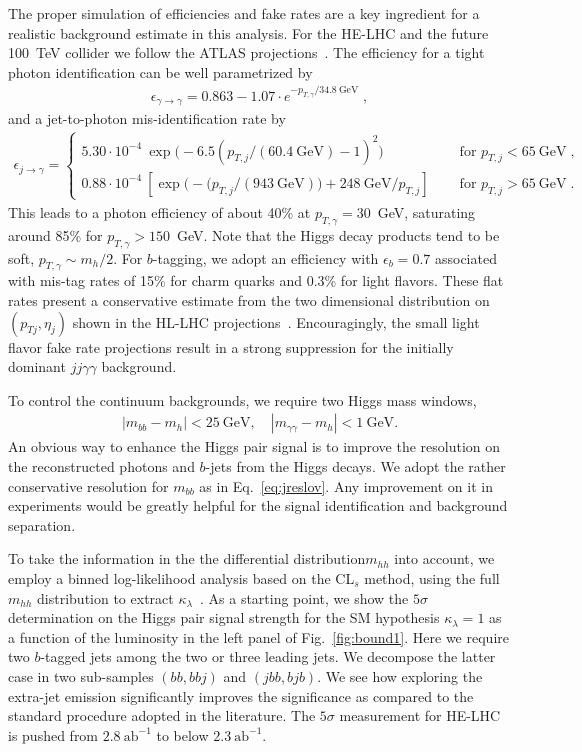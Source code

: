 The proper simulation of efficiencies and fake rates are a key
ingredient for a realistic background estimate in this analysis.  For
the HE-LHC and the future 100~TeV collider we follow the ATLAS
projections~\cite{performance}. The efficiency for a tight photon 
identification can be well parametrized by
%
\begin{align}
\epsilon_{\gamma\to\gamma} = 0.863 - 1.07 \cdot e^{-p_{T,\gamma}/34.8~\text{GeV}}\;,
\end{align}
%
and a jet-to-photon mis-identification rate by
\begin{align}
\epsilon_{j\to\gamma} = 
\begin{cases} 
5.30\cdot 10^{-4}  \ \exp\big( -6.5 \left( p_{T,j}/(60.4~\text{GeV})- 1 \right)^2 \big) 
\quad &\text{ for } p_{T,j} <65~\text{GeV} \;, \\
0.88 \cdot 10^{-4} \  \left[ \exp \big( -(p_{T,j}/(943~\text{GeV}) \big) +248~\text{GeV}/p_{T,j}\right]
\quad &\text{ for } p_{T,j} >65~\text{GeV} \;.
\end{cases}
\end{align}
%
This leads to a photon efficiency of about 40\% at $p_{T,\gamma}=30$~GeV,
saturating around 85\% for $p_{T,\gamma}>150$~GeV. Note that the 
Higgs decay products tend to be soft, $p_{T,\gamma}\sim m_h/2$. 
For $b$-tagging, we adopt an efficiency with $\epsilon_b =0.7$ associated 
with mis-tag rates of 15\% for charm quarks and 0.3\% for
light flavors. These flat rates present a conservative estimate from
the two dimensional distribution on $(p_{Tj},\eta_j)$ shown in the
HL-LHC projections~\cite{madmax-hh}. Encouragingly, the small light
flavor fake rate projections result in a strong suppression for the
initially dominant $jj\gamma\gamma$ background.

To control the continuum backgrounds, we require two Higgs mass windows,
%
\begin{align}
 |m_{bb}-m_h|<25~\text{GeV}, \quad 
 |m_{\gamma\gamma}-m_h|<1~\text{GeV}  .
 \label{eq:jreslov}
\end{align}
%
An obvious way to enhance the Higgs pair signal is to improve the
resolution on the reconstructed photons and $b$-jets from the Higgs
decays.  We adopt the rather conservative resolution for $m_{bb}$ as
in Eq.~\eqref{eq:jreslov}. Any improvement on it in experiments would
be greatly helpful for the signal identification and background
separation.  
\medskip

To take the information in the the differential distribution$m_{hh}$ into account, we employ a binned log-likelihood analysis based on the CL$_{s}$ method, using the full $m_{hh}$ distribution to extract $\kappa_{\lambda}$~\cite{read}. As a starting point, we show the $5\sigma$ determination on the Higgs pair signal strength for the SM hypothesis $\kappa_{\lambda}=1$ as a function of the luminosity in the left panel of Fig.~\ref{fig:bound1}. Here we require two $b$-tagged jets among the two or three leading jets. We decompose the latter case in two  sub-samples $(bb,bbj)$ and $(jbb,bjb)$. We see how exploring the extra-jet emission significantly improves the significance as compared to the standard procedure adopted in the literature. The $5\sigma$ measurement for HE-LHC is pushed from $2.8~\text{ab}^{-1}$ to below $2.3~\text{ab}^{-1}$. 

